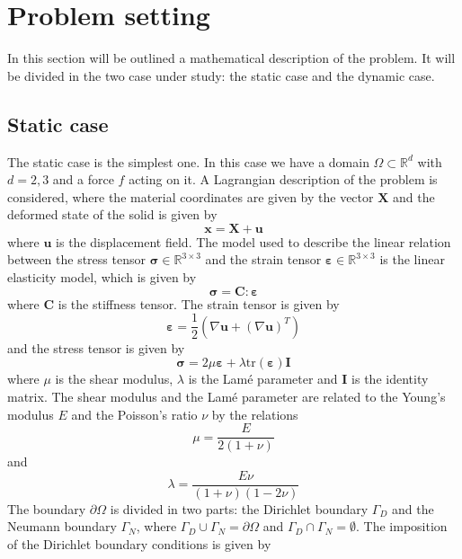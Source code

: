 \section{Problem setting}
In this section will be outlined a mathematical description of the problem. It will be divided in the two case under study: the static case and the dynamic case.

\subsection{Static case}
The static case is the simplest one. In this case we have a domain $\Omega \subset \mathbb{R}^d$ with $d=2,3$ and a force $f$ acting on it. A Lagrangian description of the problem is considered, where the material coordinates are given by the vector $\bm{X}$ and the deformed state of the solid is given by
\begin{equation}
    \bm{x} = \bm{X} + \bm{u}
\label{eq:deformation}
\end{equation}
where $\bm{u}$ is the displacement field. The model used to describe the linear relation between the stress tensor $\bm{\sigma} \in \mathbb{R}^{3\times 3}$ and the strain tensor $\bm{\varepsilon} \in \mathbb{R}^{3\times 3}$ is the linear elasticity model, which is given by
\begin{equation}
    \bm{\sigma} = \bm{C} : \bm{\varepsilon}
\label{eq:linear_elasticity}
\end{equation}
where $\bm{C}$ is the stiffness tensor. The strain tensor is given by 
\begin{equation}
    \bm{\varepsilon} = \frac{1}{2} \left( \nabla \bm{u} + (\nabla \bm{u})^T \right)
\label{eq:strain_tensor}
\end{equation}
and the stress tensor is given by
\begin{equation}
    \bm{\sigma} =  2 \mu \bm{\varepsilon} + \lambda \text{tr}(\bm{\varepsilon}) \bm{I}
\label{eq:stress_tensor}
\end{equation}
where $\mu$ is the shear modulus, $\lambda$ is the Lamé parameter and $\bm{I}$ is the identity matrix. The shear modulus and the Lamé parameter are related to the Young's modulus $E$ and the Poisson's ratio $\nu$ by the relations
\begin{equation}
    \mu = \frac{E}{2(1+\nu)}
\end{equation}
and
\begin{equation}
    \lambda = \frac{E\nu}{(1+\nu)(1-2\nu)}
\end{equation}
The boundary \( \partial \Omega \) is divided in two parts: the Dirichlet boundary \( \Gamma_D \) and the Neumann boundary \( \Gamma_N \), where \(\Gamma_D \cup \Gamma_N = \partial \Omega \) and \(\Gamma_D \cap \Gamma_N = \emptyset \). The imposition of the Dirichlet boundary conditions is given by
